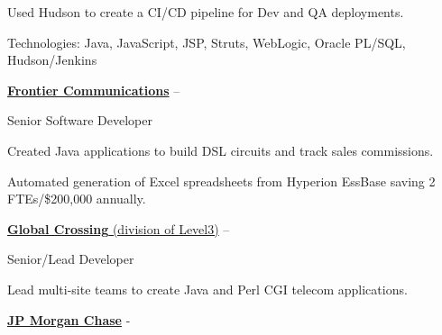 \documentclass[letterpaper,MMMMyyyy,nonstopmode]{simpleresumecv}
\newcommand{\comment}[1]{\ignorespaces} %
\newif\ifLOCATION
\begin{document}
\begin{Body}
\begin{Detail}
Used Hudson to create a CI/CD pipeline for Dev and QA deployments.

\iffalse
\BulletItem
Member of architecture team to research and set five-year strategy for web application strategy.
\fi

\Gap
Technologies: Java, JavaScript, JSP, Struts, WebLogic, Oracle PL/SQL, Hudson/Jenkins 
\end{Detail}

\BigGap
\Entry
\href{http://www.frontier.com/}
{\textbf{Frontier Communications}}
\hfill 
 -- 

Senior Software Developer
\ifLOCATION
\hfill
Rochester, New York
\fi

\begin{Detail}
Created Java applications to build DSL circuits and track sales commissions\comment{; CruiseControl used for Continuous Integration}. 

Automated generation of \comment{20} Excel spreadsheets from Hyperion EssBase saving 2 FTEs/\$200,000 annually.

\end{Detail}

\BigGap
\Entry
\href{http://www.globalcrossing.com/}
{\textbf{Global  Crossing} (division of Level3)}
\hfill 
 -- 

Senior/Lead Developer
\ifLOCATION
\hfill
Rochester, New York
\fi

\begin{Detail}
Lead multi-site teams to create Java and Perl CGI telecom applications.

\end{Detail}

\BigGap
\Entry
\href{http://www.jpmorganchase.com/}
{\textbf{JP Morgan Chase}}
\hfill 
 - 


\end{Body}
\end{document}
